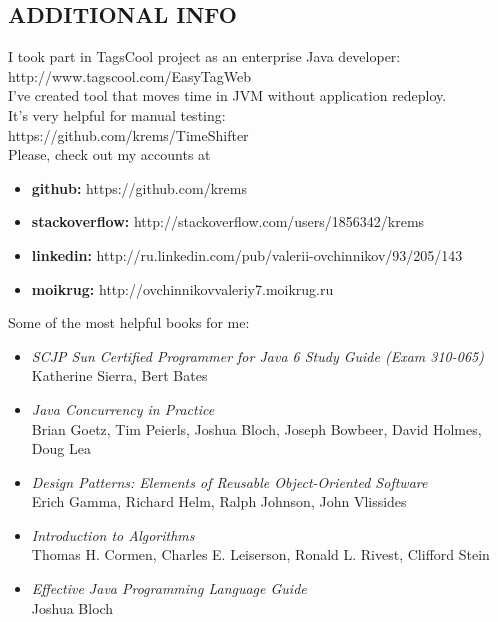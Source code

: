 \documentclass[margin,12pt]{res}
\begin{document}
\begin{resume}
\section{ADDITIONAL INFO}
I took part in TagsCool project as an enterprise Java developer:\\
http://www.tagscool.com/EasyTagWeb\\
I've created tool that moves time in JVM without application redeploy.\\
It's very helpful for manual testing:\\
https://github.com/krems/TimeShifter\\
Please, check out my accounts at\\
\begin{itemize} \itemsep -10pt
  \item \textbf{github:} https://github.com/krems\\
  \item \textbf{stackoverflow:} http://stackoverflow.com/users/1856342/krems\\
  \item \textbf{linkedin:} http://ru.linkedin.com/pub/valerii-ovchinnikov/93/205/143\\
  \item \textbf{moikrug:} http://ovchinnikovvaleriy7.moikrug.ru
\end{itemize}
Some of the most helpful books for me:\\
\begin{itemize} \itemsep -5pt
\item \textit{SCJP Sun Certified Programmer for Java 6 Study Guide
  (Exam 310-065)}\\ Katherine Sierra, Bert Bates\\
\item \textit{Java Concurrency in Practice}\\ Brian Goetz, Tim Peierls,
  Joshua Bloch, Joseph Bowbeer, David Holmes, Doug Lea\\
\item \textit{Design Patterns: Elements of Reusable Object-Oriented
  Software}\\ Erich Gamma, Richard Helm, Ralph Johnson, John Vlissides\\
\item \textit{Introduction to Algorithms}\\ Thomas H. Cormen, Charles
  E. Leiserson, Ronald L. Rivest, Clifford Stein\\
\item \textit{Effective Java Programming Language Guide}\\ Joshua Bloch\\
\end{itemize}
\end{resume}
\end{document}
